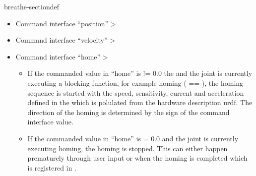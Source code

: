 \documentclass[letterpaper,10pt,english]{sphinxmanual}
\begin{document}
\begin{fulllineitems}
\begin{sphinxuseclass}{breathe-sectiondef}
\begin{fulllineitems}
\sphinxAtStartPar
\begin{itemize}
\item {} 
\sphinxAtStartPar
Command interface “position” \sphinxhyphen{}\textgreater{} {\hyperref[\detokenize{code/bioscara_hardware_drivers/index:classbioscara__hardware__drivers_1_1Joint_1a8d477e842ea6139ca17fde0af43bc482}]{}}

\item {} 
\sphinxAtStartPar
Command interface “velocity” \sphinxhyphen{}\textgreater{} {\hyperref[\detokenize{code/bioscara_hardware_drivers/index:classbioscara__hardware__drivers_1_1Joint_1a5b2479210b861c53c3c4e53cf12d75be}]{}}

\item {} 
\sphinxAtStartPar
Command interface “home” \sphinxhyphen{}\textgreater{} {\hyperref[\detokenize{code/bioscara_hardware_drivers/index:classbioscara__hardware__drivers_1_1BaseJoint_1a81b05153ca250ea09930f955ecff09f2}]{}}\begin{itemize}
\item {} 
\sphinxAtStartPar
If the commanded value in “home” is != 0.0 the and the joint is currently executing a blocking function, for example homing ({\hyperref[\detokenize{code/bioscara_hardware_drivers/index:classbioscara__hardware__drivers_1_1BaseJoint_1a412c4e474be5de0820d88b7d1d6084de}]{}} == {\hyperref[\detokenize{code/bioscara_hardware_drivers/index:classbioscara__hardware__drivers_1_1BaseJoint_1affbc9ba6c17b02af32647dc76796de13ab0bd70c81aace8775e32e0c0e1dfec45}]{}}), the homing sequence is started with the speed, sensitivity, current and acceleration defined in the {\hyperref[\detokenize{code/bioscara_hardware_interfaces/index:classbioscara__hardware__interfaces_1_1BioscaraArmHardwareInterface_1a24bfb6fef55ee2a8f659f82ab60b5a4b}]{}} which is polulated from the hardware description urdf. The direction of the homing is determined by the sign of the command interface value.

\item {} 
\sphinxAtStartPar
If the commanded value in “home” is = 0.0 and the joint is currently executing homing, the homing is stopped. This can either happen prematurely through user input or when the homing is completed which is registered in {\hyperref[\detokenize{code/bioscara_hardware_interfaces/index:classbioscara__hardware__interfaces_1_1BioscaraArmHardwareInterface_1adc34f1df847375abf18fe8100ecec1d1}]{}}.


\end{itemize}
\end{itemize}
\end{fulllineitems}
\end{sphinxuseclass}
\end{fulllineitems}
\end{document}
